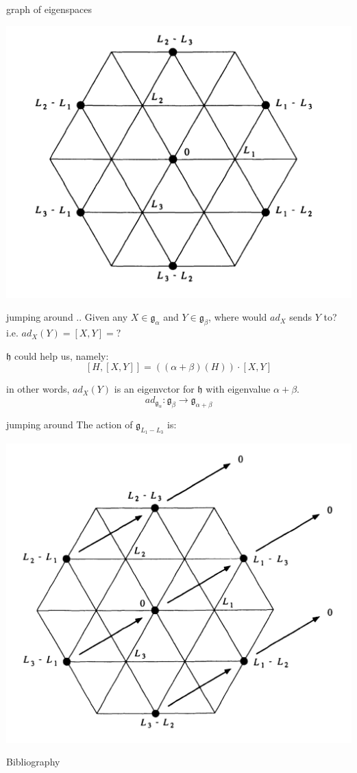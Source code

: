 \documentclass{beamer}
\begin{document}
\begin{frame}{graph of eigenspaces}
\begin{center} \includegraphics[scale=.3]{eigenvalue.jpg}\end{center}	
\end{frame}



\begin{frame}{jumping around ..}
	Given any $X \in  \mathfrak{g}_{\alpha}$ and $Y \in \mathfrak{g}_{\beta}$, where would $ad_{X}$ sends $Y$ to? i.e.  $ad_{X}(Y) = [X,Y] = ?$

	$\mathfrak{h}$ could help us, namely:
		\[[H,[X,Y]] = ((\alpha+\beta)(H)) \cdot [X,Y] \]

		in other words, $ad_{X}(Y)$ is an eigenvctor for $\mathfrak{h}$ with eigenvalue  $\alpha +\beta$.  \[
			ad_{\mathfrak{g}_{\alpha}}: \mathfrak{g}_{\beta} \to \mathfrak{g}_{\alpha+\beta}
		\] 
\end{frame}

\begin{frame}{jumping around}
	The action of $\mathfrak{g}_{L_1-L_3}$ is:
	\begin{center} \includegraphics[scale=.3]{L1-L3.png}\end{center}
\end{frame}

\begin{frame}{Bibliography}
	\nocite{*}
	
\end{frame}
\end{document}
